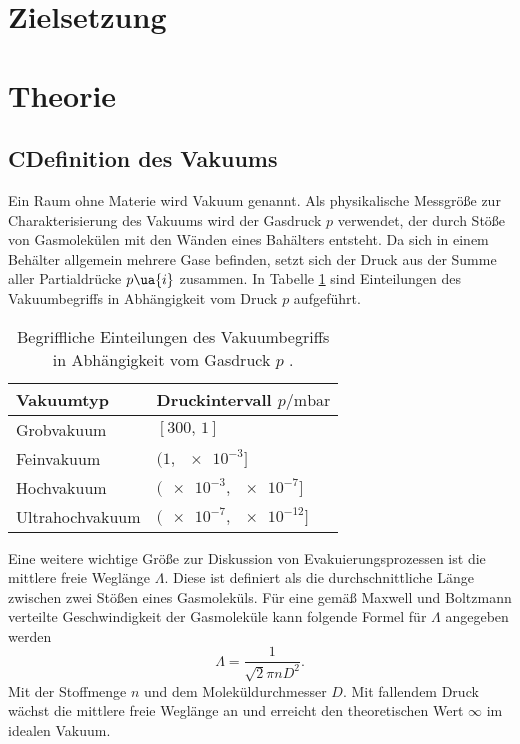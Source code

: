 \setcounter{page}{1}
\section*{Zielsetzung}

\section{Theorie}
\subsection{CDefinition des Vakuums}
Ein Raum ohne Materie wird Vakuum genannt. Als physikalische Messgröße zur Charakterisierung
des Vakuums wird der Gasdruck $p$ verwendet, der durch Stöße von Gasmolekülen mit den Wänden eines Bahälters
entsteht. Da sich in einem Behälter allgemein mehrere Gase befinden, setzt sich der Druck aus der Summe aller
Partialdrücke $p\ua{i}$ zusammen.
In Tabelle \ref{tab: vakuumbegriffe} sind Einteilungen des Vakuumbegriffs in Abhängigkeit vom
Druck $p$ aufgeführt.
\begin{table}
  \centering
  \begin{tabular}{l l}
    \toprule
    {Vakuumtyp} & {Druckintervall $p/\si{\milli\bar}$} \\
    \midrule
    Grobvakuum &  $[\num{300},\,\num{1}]$ \\
    Feinvakuum &  $(\num{1},\,\num{e-3}]$ \\
    Hochvakuum &  $(\num{e-3},\,\num{e-7}]$ \\
    Ultrahochvakuum &  $(\num{e-7},\,\num{e-12}]$ \\
    \bottomrule
  \end{tabular}
  \caption{Begriffliche Einteilungen des Vakuumbegriffs in Abhängigkeit vom Gasdruck $p$ \cite{dem1}.}
  \label{tab: vakuumbegriffe}
\end{table}
Eine weitere wichtige Größe zur Diskussion von Evakuierungsprozessen ist die mittlere freie
Weglänge $\Lambda$. Diese ist definiert als die durchschnittliche Länge zwischen zwei Stößen
eines Gasmoleküls. Für eine gemäß Maxwell und Boltzmann verteilte Geschwindigkeit der Gasmoleküle kann
folgende Formel für $\Lambda$ angegeben werden
\begin{equation}
  \Lambda = \frac{1}{\sqrt{2}\pi n D^2}.
\end{equation}
Mit der Stoffmenge $n$ und dem Moleküldurchmesser $D$. Mit fallendem Druck wächst die mittlere freie
Weglänge an und erreicht den theoretischen Wert $\infty$ im idealen Vakuum.

